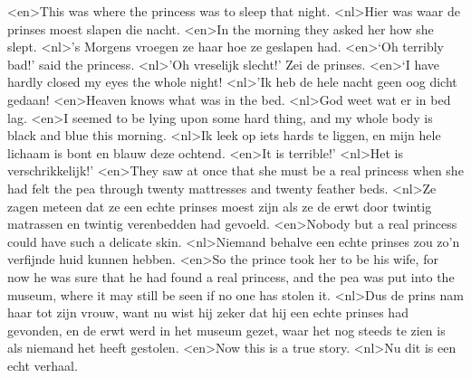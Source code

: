 <en>This was where the princess was to sleep that night.
<nl>Hier was waar de prinses  moest slapen die nacht.
<en>In the morning they asked her how she slept.
<nl>'s Morgens vroegen ze haar hoe ze geslapen had.
<en>‘Oh terribly bad!’ said the princess.
<nl>'Oh vreselijk slecht!' Zei de prinses.
<en>‘I have hardly closed my eyes the whole night!
<nl>'Ik heb de hele nacht geen  oog dicht gedaan!
<en>Heaven knows what was in the bed.
<nl>God weet wat er in bed lag.
<en>I seemed to be lying upon some hard thing, and my whole body is black and blue this morning.
<nl>Ik leek op iets hards te liggen, en mijn hele lichaam is  bont en blauw deze ochtend.
<en>It is terrible!’
<nl>Het is verschrikkelijk!'
<en>They saw at once that she must be a real princess when she had felt the pea through twenty mattresses and twenty feather beds.
<nl>Ze zagen meteen dat ze een echte prinses moest zijn als ze de erwt door twintig matrassen en twintig verenbedden had gevoeld.
<en>Nobody but a real princess could have such a delicate skin.
<nl>Niemand behalve een echte prinses zou zo'n verfijnde huid kunnen hebben.
<en>So the prince took her to be his wife, for now he was sure that he had found a real princess, and the pea was put into the museum, where it may still be seen if no one has stolen it.
<nl>Dus de prins nam haar tot zijn vrouw, want nu wist hij zeker dat hij een echte prinses had gevonden, en de erwt werd in het museum gezet, waar het nog steeds te zien is als niemand het heeft gestolen.
<en>Now this is a true story.
<nl>Nu dit is een echt  verhaal.
